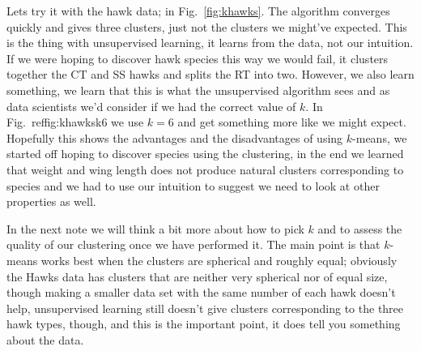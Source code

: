 \documentclass[12pt]{article}
\begin{document}
Lets try it with the hawk data; in Fig.~\ref{fig:khawks}. The
algorithm converges quickly and gives three clusters, just not the
clusters we might've expected. This is the thing with unsupervised
learning, it learns from the data, not our intuition. If we were
hoping to discover hawk species this way we would fail, it clusters
together the CT and SS hawks and splits the RT into two. However, we
also learn something, we learn that this is what the unsupervised
algorithm sees and as data scientists we'd consider if we had the
correct value of $k$. In Fig.~ref{fig:khawksk6} we use $k=6$ and get
something more like we might expect. Hopefully this shows the
advantages and the disadvantages of using $k$-means, we started off
hoping to discover species using the clustering, in the end we learned
that weight and wing length does not produce natural clusters
corresponding to species and we had to use our intuition to suggest we
need to look at other properties as well.

In the next note we will think a bit more about how to pick $k$ and to
assess the quality of our clustering once we have performed it. The
main point is that $k$-means works best when the clusters are
spherical and roughly equal; obviously the Hawks data has clusters
that are neither very spherical nor of equal size, though making a
smaller data set with the same number of each hawk doesn't help,
unsupervised learning still doesn't give clusters corresponding to the
three hawk types, though, and this is the important point, it does
tell you something about the data.
\end{document}
